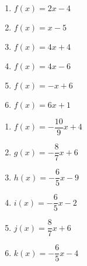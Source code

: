 \documentclass[11pt]{article}
\begin{document}
\begin{exercice}
\begin{multicols}{2}
\begin{enumerate}
\item  $f(x)=2x-4$ 
\item  $f(x)=x-5$ 
\item  $f(x)=4x+4$ 
\item  $f(x)=4x-6$ 
\item  $f(x)=-x+6$ 
\item  $f(x)=6x+1$ 
\end{enumerate}
\end{multicols}
\end{exercice}

\begin{exercice}
\begin{multicols}{2}
\begin{enumerate}
	\item  $f(x)=-\dfrac{10}{9}x+4$
	\item  $g(x)=-\dfrac{8}{7}x+6$
	\item  $h(x)=-\dfrac{6}{5}x-9$
	\item  $i(x)=-\dfrac{6}{5}x-2$
	\item  $j(x)=\dfrac{8}{7}x+6$
	\item  $k(x)=-\dfrac{6}{5}x-4$
\end{enumerate}
\end{multicols}
\end{exercice}
\end{document}
